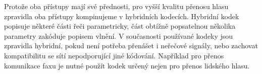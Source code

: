 Protože oba přístupy mají své přednosti, pro vyšší kvalitu přenosu hlasu 
zpravidla oba přístupy kompinujeme v hybridních kodecích. Hybridní kodek
popisuje některé části řeči parametricky, část obtížně popsatelnou několika
parametry zakóduje popisem vlnění. V současnosti používané kodeky jsou 
zpravidla hybridní, pokud není potřeba přenášet i neřečové signály,
nebo zachovat kompatibilitu se sítí nepodporující jiné kódování. Například 
pro přenos komunikace faxu je nutné použít kodek určený nejen pro přenos 
lidského hlasu.

